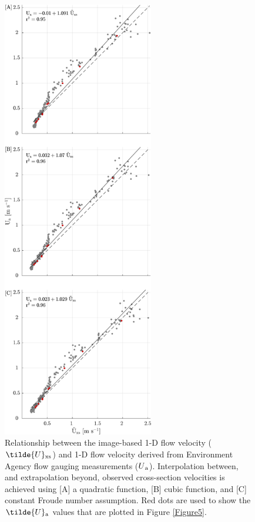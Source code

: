 \documentclass[hess, manuscript]{copernicus} %
\begin{document}
\begin{figure}[H]
\centering 
\includegraphics[width=6.6cm]{Main/Initial_submission_2024/Figures/Figure4.pdf}
\caption{Relationship between the image-based 1-D flow velocity ($\tilde{U}\textsubscript{xs}$) and 1-D flow velocity derived from Environment Agency flow gauging measurements ($U\textsubscript{a}$). Interpolation between, and extrapolation beyond, observed cross-section velocities is achieved using [A] a quadratic function, [B] cubic function, and [C] constant Froude number assumption. Red dots are used to show the $\tilde{U}\textsubscript{a}$ values that are plotted in Figure \ref{Figure5}.}
\label{Figure4} 
\end{figure}
\end{document}

